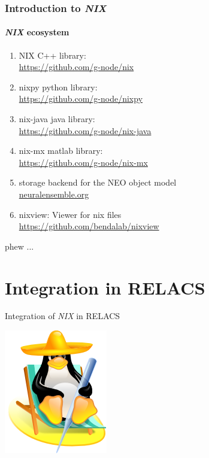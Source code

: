 \documentclass[pdftex, xcolor=table]{beamer}
\newcommand{\rot}[1]{{\color{tug} #1}}
\newcommand{\nix}{\textit{NIX}}
\begin{document}
\begin{frame}[fragile]
  \frametitle{Introduction to \nix{}}
  \framesubtitle{\nix{} ecosystem}

  \begin{enumerate}
  \item NIX C++ library: \\\url{https://github.com/g-node/nix}
  \item nixpy python library: \\\url{https://github.com/g-node/nixpy}
  \item nix-java java library: \\\url{https://github.com/g-node/nix-java}
  \item nix-mx matlab library: \\\url{https://github.com/g-node/nix-mx}
    \vspace{1cm}
  \item storage backend for the NEO object model \\\url{neuralensemble.org}
  \item nixview: Viewer for nix files \\\url{https://github.com/bendalab/nixview}
  \end{enumerate}
\end{frame}

\begin{frame}
 \huge{\rot{phew ...}}
\end{frame}


\section{Integration in RELACS}

\begin{frame}
  \huge{\rot{Integration of \nix{} in RELACS}}
  \vspace{4ex}
   \begin{center}
    \includegraphics[width=0.25\columnwidth]{images/relacstux.png}
  \end{center}
\end{frame}
\end{document}

